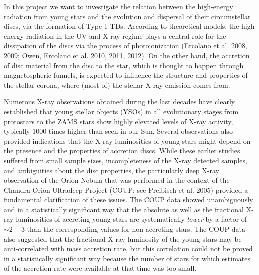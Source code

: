 \vspace{0.5em}


In this project we want to investigate  the relation between the high-energy radiation 
from young stars and the
 evolution and dispersal of their circumstellar discs, via the
 formation of Type 1 TDs.  
According to theoretical models, the high energy radiation in the UV and X-ray 
regime 
plays a central role for the dissipation of the discs via the process
of photoionization (Ercolano et al. 2008, 2009; Owen, Ercolano et
al. 2010, 2011, 2012).
On the other hand, the accretion of disc material from the disc to the star, which is
thought to happen through magnetospheric  funnels, is expected to influence the 
structure and properties of the stellar corona, where (most of) the stellar X-ray emission 
comes from.

Numerous X-ray observations obtained during the last decades have clearly 
established that young stellar objects (YSOs) in all evolutionary stages from 
protostars  to the ZAMS stars show highly elevated levels of X-ray  activity,
typically 1000 times higher than seen in our Sun. 
Several observations %
also provided indications that
the X-ray luminosities of young stars might depend on the presence 
and the properties of accretion discs. While these earlier studies suffered
from  small sample sizes, incompleteness of the
 X-ray detected samples, and ambiguities about the disc properties,
the particularly deep X-ray observation of the Orion Nebula that was performed in the context of the
Chandra Orion Ultradeep Project (COUP; see Preibisch et al. 2005)
provided a fundamental clarification of these issues.
The COUP data showed unambiguously
and in a statistically significant way
that the  absolute as well as the fractional X-ray luminosities
of  accreting young stars  are systematically {\em lower} by a factor of
 $\sim 2-3$ than the corresponding values for  non-accreting stars.
%
%
The COUP data also suggested that the fractional X-ray luminosity 
of the young stars may be anti-correlated
with mass accretion rate, but this correlation could not be proved in a statistically
significant way because the number of stars for which estimates of the 
accretion rate were available at that time was too small.
\smallskip

